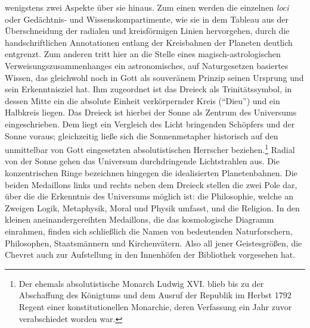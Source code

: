 wenigstens zwei Aspekte über sie hinaus. Zum einen werden die einzelnen
\emph{loci} oder Gedächtnis- und Wissenskompartimente, wie sie in dem
Tableau aus der Überschneidung der radialen und kreisförmigen Linien
hervorgehen, durch die handschriftlichen Annotationen entlang der
Kreisbahnen der Planeten deutlich entgrenzt. Zum anderen tritt hier an
die Stelle eines magisch-astrologischen Verweisungszusammenhanges ein
astronomisches, auf Naturgesetzen basiertes Wissen, das gleichwohl noch
in Gott als souveränem Prinzip seinen Ursprung und sein Erkenntnisziel
hat. Ihm zugeordnet ist das Dreieck als Trinitätssymbol, in dessen Mitte
ein die absolute Einheit verkörpernder Kreis (\enquote{Dieu}) und ein
Halbkreis liegen. Das Dreieck ist hierbei der Sonne als Zentrum des
Universums eingeschrieben. Dem liegt ein Vergleich des Licht bringenden
Schöpfers und der Sonne voraus; gleichzeitig ließe sich die
Sonnenmetapher historisch auf den unmittelbar von Gott eingesetzten
absolutistischen Herrscher beziehen.\footnote{Der ehemals
  absolutistische Monarch Ludwig XVI. blieb bis zu der Abschaffung des
  Königtums und dem Ausruf der Republik im Herbst 1792 Regent einer
  konstitutionellen Monarchie, deren Verfassung ein Jahr zuvor
  verabschiedet worden war.} Radial von der Sonne gehen das Universum
durchdringende Lichtstrahlen aus. Die konzentrischen Ringe bezeichnen
hingegen die idealisierten Planetenbahnen. Die beiden Medaillons links
und rechts neben dem Dreieck stellen die zwei Pole dar, über die die
Erkenntnis des Universums möglich ist: die Philosophie, welche an
Zweigen Logik, Metaphysik, Moral und Physik umfasst, und die Religion.
In den kleinen aneinandergereihten Medaillons, die das kosmologische
Diagramm einrahmen, finden sich schließlich die Namen von bedeutenden
Naturforschern, Philosophen, Staatsmännern und Kirchenvätern. Also all
jener Geistesgrößen, die Chevret auch zur Aufstellung in den Innenhöfen
der Bibliothek vorgesehen hat.


